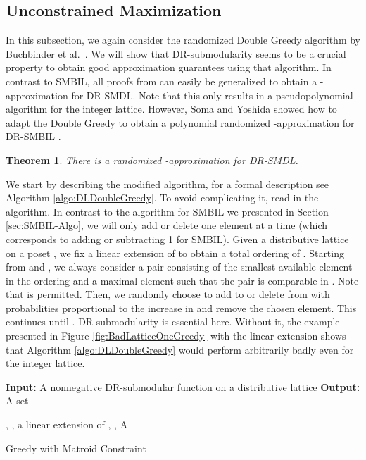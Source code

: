 \documentclass{article}
\theoremstyle{plain}
\newtheorem{theorem}{Theorem}
\theoremstyle{definition}
\begin{document}
\subsection{Unconstrained Maximization}
In this subsection, we again consider the randomized Double Greedy algorithm by Buchbinder et al.\ \cite{DoubleGreedy}. 
We will show that DR-submodularity seems to be a crucial property to obtain good approximation guarantees using that algorithm. 
In contrast to SMBIL, all proofs from \cite{DoubleGreedy} can easily be generalized to obtain a -approximation
for DR-SMDL. 
Note that this only results in a pseudopolynomial algorithm for the integer lattice. 
However, Soma and Yoshida showed how to adapt the Double Greedy to obtain a polynomial randomized -approximation
for DR-SMBIL \cite{SomaDR-SMBIL}. 
\begin{theorem}\label{thm:AlgoDR-SMDL}
 There is a randomized -approximation for DR-SMDL. 
\end{theorem}

We start by describing the modified algorithm, for a formal description see Algorithm \ref{algo:DLDoubleGreedy}. 
To avoid complicating it, read  in the algorithm.  
In contrast to the algorithm for SMBIL we presented in Section \ref{sec:SMBIL-Algo}, we will 
only add or delete one element at a time (which corresponds to adding or subtracting 1 for SMBIL). 
Given a distributive lattice  on a poset , we fix a linear extension of  to obtain a total ordering
 of . Starting from  and , 
we always consider a pair  consisting of the smallest available element in the ordering and a maximal
element  such that the pair is comparable in . Note that  is permitted.   
Then, we randomly choose to add  to  or delete  from  with probabilities proportional to the increase in  and 
remove the chosen element. This continues until . 
DR-submodularity is essential here.  Without it, the example presented in Figure \ref{fig:BadLatticeOneGreedy} 
with the linear extension  shows that Algorithm \ref{algo:DLDoubleGreedy} 
would perform arbitrarily badly even for the integer lattice. 

\begin{algorithm2e}
\DontPrintSemicolon
\textbf{Input:} A nonnegative DR-submodular function  on a distributive lattice \;
\textbf{Output:} A set \;

 , ,  a linear extension of , \; , \; 
    \Return A\;
 \caption{Greedy with Matroid Constraint}\label{algo:DLDoubleGreedy}
\end{algorithm2e}
\end{document}
